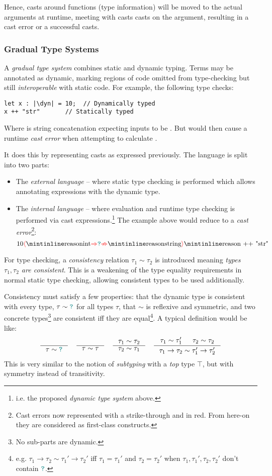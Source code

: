 Hence, casts around functions (type information) will be moved to the actual arguments at runtime, meeting with casts casts on the argument, resulting in a cast error or a successful casts.

\subsubsection{Gradual Type Systems}\label{sec:GradualTypeSystem}

A \textit{gradual type system} \cite{GradualRefined, GradualFunctional} combines static and dynamic typing. Terms may be annotated as dynamic, marking regions of code omitted from type-checking but still \textit{interoperable} with static code. For example, the following type checks:
\begin{verbatim}
let x : |\dyn| = 10;  // Dynamically typed
x ++ "str"       // Statically typed
\end{verbatim}
Where \code{++} is string concatenation expecting inputs to be . But would then cause a runtime \textit{cast error} when attempting to calculate .

It does this by representing casts as expressed previously. The language is split into two parts:
\begin{itemize}
\item The \textit{external language} -- where static type checking is performed which allows annotating expressions with the dynamic type.
\item The \textit{internal language} -- where evaluation and runtime type checking is performed via cast expressions.\footnote{i.e. the proposed \textit{dynamic type system} above.} The example above would reduce to a \textit{cast error}\footnote{Cast errors now represented with a strike-through and in red. From here-on they are considered as first-class constructs.}: \[10\scasterror{\code{int}}{\code{string}}\code{ ++ "str"}\]
\end{itemize}
For type checking, a \textit{consistency} relation $\tau_1 \sim \tau_2$ is introduced meaning \textit{types $\tau_1, \tau_2$ are consistent}. This is a weakening of the type equality requirements in normal static type checking, allowing consistent types to be used additionally.

Consistency must satisfy a few properties: that the dynamic type is consistent with every type, $\tau \sim {\color{teal}\texttt{?}}$ for all types $\tau$, that $\sim$ is reflexive and symmetric, and two concrete types\footnote{No sub-parts are dynamic.} are consistent iff they are equal\footnote{e.g. $\tau_1 \to \tau_2 \sim \tau_1' \to \tau_2'$ iff $\tau_1 = \tau_1'$ and $\tau_2 = \tau_2'$ when $\tau_1, \tau_1', \tau_2, \tau_2'$ don't contain ${\color{teal}\texttt{?}}$.}. A typical definition would be like:
\[\inference{}{\tau \sim \dyn} \quad \inference{}{\tau \sim \tau} \quad \inference{\tau_1 \sim \tau_2}{\tau_2 \sim \tau_1} \quad \inference{\tau_1 \sim \tau_1' & \tau_2 \sim \tau_2}{\tau_1 \to \tau_2 \sim \tau_1' \to \tau_2'}\]
This is very similar to the notion of \textit{subtyping} \cite[ch. 15]{TAPL} with a \textit{top} type $\top$, but with symmetry instead of transitivity.

